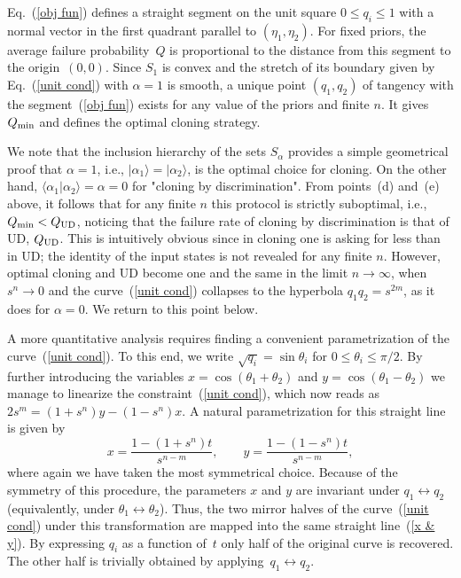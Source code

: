 \documentclass[aps,prl,twocolumn,showpacs]{revtex4}
\begin{document}
Eq.~(\ref{obj fun}) defines a straight segment on the unit square $0\le q_i\le 1$ with a normal vector in the first quadrant parallel to $(\eta_1,\eta_2)$. For fixed priors, the average failure probability~$Q$ is proportional to the distance from this segment to the origin~$(0,0)$. 
Since $S_1$ is convex and the stretch of its boundary given by Eq.~(\ref{unit cond}) with $\alpha=1$ is smooth, a unique point $(q_1,q_2)$ of tangency with the segment~(\ref{obj fun}) exists for any value of the priors and finite $n$.
It gives $Q_{\rm min}$ and defines the optimal cloning strategy. %

We note that the inclusion hierarchy of the sets $S_\alpha$ provides a simple geometrical proof that $\alpha=1$, i.e., $|\alpha_1\rangle=|\alpha_2\rangle$, is the optimal choice for cloning. On the other hand, $\langle\alpha_1|\alpha_2\rangle=\alpha=0$ for "cloning by discrimination". From points~(d) and~(e) above, it follows that for any finite $n$ this protocol is strictly suboptimal, i.e., $Q_{\rm min}<Q_{\rm UD}$, noticing that the failure rate of cloning by discrimination is that of UD, $Q_{\rm UD}$. This is intuitively obvious since in cloning one is asking for less than in UD; the identity of the input states is not revealed for any finite $n$. However, optimal cloning and UD become one and the same in the limit $n \to \infty$, when $s^n \to 0$ and the curve~(\ref{unit cond}) collapses to the hyperbola $q_1 q_2=s^{2m}$, as it does for $\alpha=0$. We return to this point below.

A more quantitative analysis requires finding a convenient parametrization of the curve~(\ref{unit cond}). To this end, we write $\sqrt{q_i} = \sin \theta_i$ for $0\leq \theta_i \leq \pi/2$. By further introducing the variables $x =\cos(\theta_1+\theta_2)$ and $y = \cos (\theta_1 - \theta_2)$ we manage to linearize the constraint~(\ref{unit cond}),
which now reads as $2s^m=(1+s^n)y-(1-s^n)x$. A natural parametrization for this straight line is given by 
%
\begin{equation}
x=\frac{1-(1+s^n)t}{s^{n-m}},\qquad y=\frac{1-(1-s^n)t}{s^{n-m}},
\label{x & y}
\end{equation}
%
where again we have taken the most symmetrical choice.
%
%
Because of the symmetry of this procedure, the parameters $x$ and $y$ are invariant under $q_1\leftrightarrow q_2$ (equivalently, under $\theta_1\leftrightarrow \theta_2$). Thus, the two mirror halves of the curve~(\ref{unit cond}) under this transformation are mapped into the same straight line~(\ref{x & y}). By expressing $q_i$ as a function of~$t$ only half of the original curve is recovered. The other half is trivially obtained by applying~$q_1\leftrightarrow q_2$.
\end{document}
